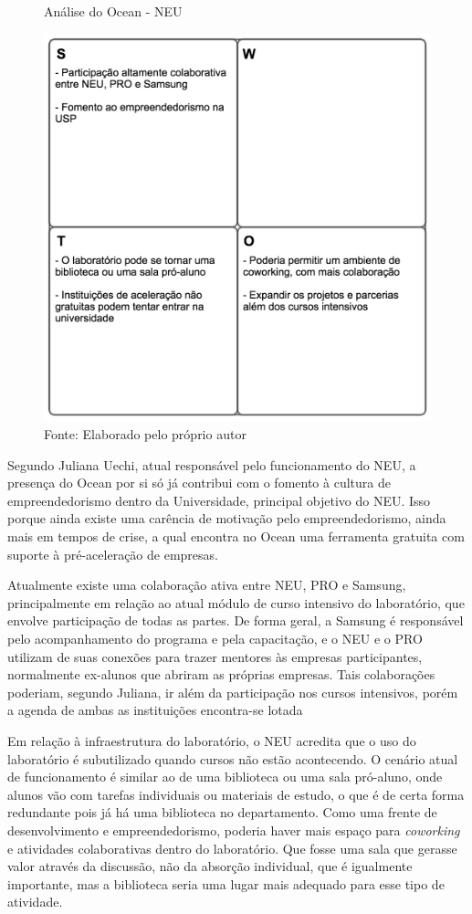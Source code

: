 \begin{figure}[H]
\caption{Análise do Ocean - NEU}
\centerline{\includegraphics[scale=0.75]{img/neuswot}}
\label{fig:swotneu}
\caption* {Fonte: Elaborado pelo próprio autor}
\end{figure}

Segundo Juliana Uechi, atual responsável pelo funcionamento do NEU, a presença do Ocean por si só já contribui com o fomento à cultura de empreendedorismo dentro da Universidade, principal objetivo do NEU. Isso porque ainda existe uma carência de motivação pelo empreendedorismo, ainda mais em tempos de crise, a qual encontra no Ocean uma ferramenta gratuita com suporte à pré-aceleração de empresas. 

Atualmente existe uma colaboração ativa entre NEU, PRO e Samsung, principalmente em relação ao atual módulo de curso intensivo do laboratório, que envolve participação de todas as partes. De forma geral, a Samsung é responsável pelo acompanhamento do programa e pela capacitação, e o NEU e o PRO utilizam de suas conexões para trazer mentores às empresas participantes, normalmente ex-alunos que abriram as próprias empresas. Tais colaborações poderiam, segundo Juliana, ir além da participação nos cursos intensivos, porém a agenda de ambas as instituições encontra-se lotada

Em relação à infraestrutura do laboratório, o NEU acredita que o uso do laboratório é subutilizado quando cursos não estão acontecendo. O cenário atual de funcionamento é similar ao de uma biblioteca ou uma sala pró-aluno, onde alunos vão com tarefas individuais ou materiais de estudo, o que é de certa forma redundante pois já há uma biblioteca no departamento. Como uma frente de desenvolvimento e empreendedorismo, poderia haver mais espaço para \textit{coworking} e atividades colaborativas dentro do laboratório. Que fosse uma sala que gerasse valor através da discussão, não da absorção individual, que é igualmente importante, mas a biblioteca seria uma lugar mais adequado para esse tipo de atividade.

